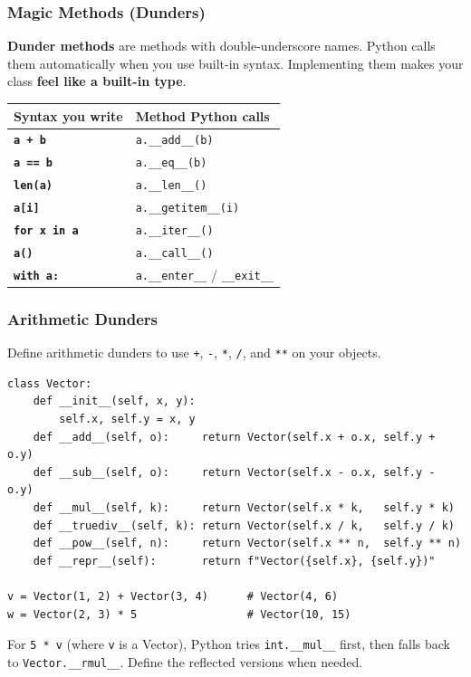 \documentclass[aspectratio=169,10pt]{beamer}
\newcommand{\keyword}[1]{\textcolor{PrimaryBlue}{\textbf{#1}}}
\newcommand{\codeword}[1]{\texttt{#1}}
\newcommand{\code}[1]{\texttt{#1}}
\newenvironment{bluebox}[1]{%
  \vspace{0.08cm}\begin{tcolorbox}[lecturebox,title={#1},fontupper=\small]%
}{\end{tcolorbox}\vspace{0.05cm}}
\begin{document}
\begin{frame}[fragile]
\frametitle{Magic Methods (Dunders)}
\small
\keyword{Dunder methods} are methods with double-underscore names. Python calls them automatically when you use built-in syntax. Implementing them makes your class \keyword{feel like a built-in type}.

\vspace{0.15cm}
\renewcommand{\arraystretch}{1.25}
\begin{tabularx}{\linewidth}{>{\bfseries}p{3.0cm}X}
\toprule
Syntax you write & Method Python calls \\
\midrule
\code{a + b}              & \codeword{a.\_\_add\_\_(b)} \\
\code{a == b}             & \codeword{a.\_\_eq\_\_(b)} \\
\code{len(a)}             & \codeword{a.\_\_len\_\_()} \\
\code{a[i]}               & \codeword{a.\_\_getitem\_\_(i)} \\
\code{for x in a}         & \codeword{a.\_\_iter\_\_()} \\
\code{a()}                & \codeword{a.\_\_call\_\_()} \\
\code{with a:}            & \codeword{a.\_\_enter\_\_} / \codeword{\_\_exit\_\_} \\
\bottomrule
\end{tabularx}
\end{frame}


\begin{frame}[fragile]
\frametitle{Arithmetic Dunders}
\small
Define arithmetic dunders to use \codeword{+}, \codeword{-}, \codeword{*}, \codeword{/}, and \codeword{**} on your objects.

\vspace{0.12cm}
\begin{lstlisting}[style=pycode]
class Vector:
    def __init__(self, x, y):
        self.x, self.y = x, y
    def __add__(self, o):     return Vector(self.x + o.x, self.y + o.y)
    def __sub__(self, o):     return Vector(self.x - o.x, self.y - o.y)
    def __mul__(self, k):     return Vector(self.x * k,   self.y * k)
    def __truediv__(self, k): return Vector(self.x / k,   self.y / k)
    def __pow__(self, n):     return Vector(self.x ** n,  self.y ** n)
    def __repr__(self):       return f"Vector({self.x}, {self.y})"

v = Vector(1, 2) + Vector(3, 4)      # Vector(4, 6)
w = Vector(2, 3) * 5                 # Vector(10, 15)
\end{lstlisting}

\begin{bluebox}{Reflected operations}
For \codeword{5 * v} (where \texttt{v} is a Vector), Python tries \codeword{int.\_\_mul\_\_} first, then falls back to \codeword{Vector.\_\_rmul\_\_}. Define the reflected versions when needed.
\end{bluebox}
\end{frame}
\end{document}
